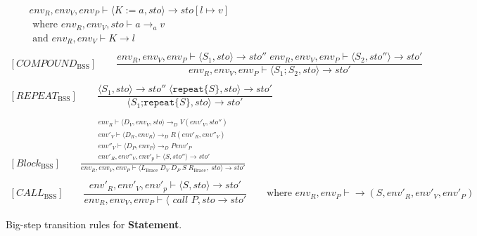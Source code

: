 \begin{figure}[htbp]
	\centering
	\begin{gather*}
		[ASSIGNMENT_\text{BSS}] 
		\qquad env_R, env_V, env_P \vdash \langle K:=a,sto\rangle \rightarrow sto[l\mapsto v] \\
		\qquad \text{ where } env_R, env_V, sto \vdash a \rightarrow_a v\\
		\qquad \text{ and } env_R, env_V \vdash K \rightarrow \textit{l}
		\\
		\\
		[COMPOUND_\text{BSS}] 
		\qquad \dfrac
		{env_R, env_V, env_P \vdash \langle S_1, sto \rangle \rightarrow sto'' \; env_R, env_V, env_P \vdash \langle S_2, sto'' \rangle \rightarrow sto'}
		{env_R, env_V, env_P \vdash \langle S_1;S_2,sto \rangle\rightarrow sto'}
		\\
		\\
		[REPEAT_\text{BSS}] 
		\qquad \dfrac
		{\langle S_1, sto \rangle \rightarrow sto'' \;\langle \texttt{repeat} \{S\}, sto \rangle \rightarrow sto'}
		{\langle S_1 \texttt{;repeat} \{S\}, sto \rangle\rightarrow sto'}
		\\
		\\
		[Block_\text{BSS}] 
		\qquad \frac
		{
			\begin{gathered}
				env_R \vdash \langle D_V, env_V, sto \rangle \rightarrow_DV (env'_V, sto'') \\
				env'_V \vdash \langle D_R, env_R \rangle \rightarrow_DR (env'_R, env''_V) \\
				env''_V \vdash \langle D_P, env_P \rangle \rightarrow_DP env'_P \\
				env'_R, env''_V, env'_p \vdash \langle S, sto'' \rangle \rightarrow sto'
			\end{gathered}
		}
		{env_R, env_V, env_P \vdash \langle L_\text{Brace} \; D_V \; D_P \; S \; R_\text{Brace}, \; sto\rangle\rightarrow sto'}
		\\
		\\
		[CALL_\text{BSS}]
		\qquad \dfrac{env'_R, env'_V, env'_p \vdash \langle S,sto \rangle \rightarrow sto'}{env_R, env_V, env_P \vdash \langle \textit{ call } P, sto \rightarrow sto'}
		\qquad \text{where } env_R, env_P \vdash \rightarrow (S, env'_R, env'_V, env'_P)
	\end{gather*}
	\caption{Big-step transition rules for \textbf{Statement}.}
	\label{fig:BssStm}
\end{figure}

